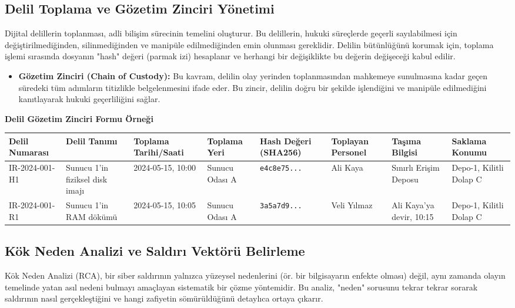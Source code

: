 \subsection{Delil Toplama ve Gözetim Zinciri Yönetimi}

Dijital delillerin toplanması, adli bilişim sürecinin temelini oluşturur. Bu delillerin, hukuki süreçlerde geçerli sayılabilmesi için değiştirilmediğinden, silinmediğinden ve manipüle edilmediğinden emin olunması gereklidir. Delilin bütünlüğünü korumak için, toplama işlemi sırasında dosyanın "hash" değeri (parmak izi) hesaplanır ve herhangi bir değişiklikte bu değerin değişeceği kabul edilir.

\begin{itemize}
    \item \textbf{Gözetim Zinciri (Chain of Custody):} Bu kavram, delilin olay yerinden toplanmasından mahkemeye sunulmasına kadar geçen süredeki tüm adımların titizlikle belgelenmesini ifade eder. Bu zincir, delilin doğru bir şekilde işlendiğini ve manipüle edilmediğini kanıtlayarak hukuki geçerliliğini sağlar.
\end{itemize}
\textbf{Delil Gözetim Zinciri Formu Örneği}
\begin{tabular}{|l|l|l|l|l|l|l|l|}
\hline
Delil Numarası & Delil Tanımı & Toplama Tarihi/Saati & Toplama Yeri & Hash Değeri (SHA256) & Toplayan Personel & Taşıma Bilgisi & Saklama Konumu \\
\hline
IR-2024-001-H1 & Sunucu 1'in fiziksel disk imajı & 2024-05-15, 10:00 & Sunucu Odası A & \texttt{e4c8e75...} & Ali Kaya & Sınırlı Erişim Deposu & Depo-1, Kilitli Dolap C \\
\hline
IR-2024-001-R1 & Sunucu 1'in RAM dökümü & 2024-05-15, 10:05 & Sunucu Odası A & \texttt{3a5a7d9...} & Veli Yılmaz & Ali Kaya'ya devir, 10:15 & Depo-1, Kilitli Dolap C \\
\hline
\end{tabular}

\subsection{Kök Neden Analizi ve Saldırı Vektörü Belirleme}

Kök Neden Analizi (RCA), bir siber saldırının yalnızca yüzeysel nedenlerini (ör. bir bilgisayarın enfekte olması) değil, aynı zamanda olayın temelinde yatan asıl nedeni bulmayı amaçlayan sistematik bir çözme yöntemidir. Bu analiz, "neden" sorusunu tekrar tekrar sorarak saldırının nasıl gerçekleştiğini ve hangi zafiyetin sömürüldüğünü detaylıca ortaya çıkarır.

